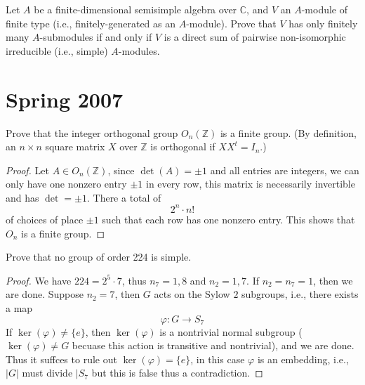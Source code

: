 \documentclass[openany]{book}
\newcommand{\Z}{\mathbb{Z}}
\begin{document}
\begin{prob}
    Let \(A\) be a finite-dimensional semisimple algebra over \(\mathbb{C}\), and \(V\) an \(A\)-module of finite type (i.e., finitely-generated as an \(A\)-module). Prove that \(V\) has only finitely many \(A\)-submodules if and only if \(V\) is a direct sum of pairwise non-isomorphic irreducible (i.e., simple) \(A\)-modules.
\end{prob}







\chapter{Spring 2007}



\begin{prob}
    Prove that the integer orthogonal group \(O_n(\mathbb{Z})\) is a finite group. (By definition, an \(n \times n\) square matrix \(X\) over \(\mathbb{Z}\) is orthogonal if \(XX^t = I_n\).)
\end{prob}
\begin{proof}
    Let $A\in O_n(\Z)$, since $\det(A)=\pm 1$ and all entries are integers, we can only have one nonzero entry $\pm 1$ in every row, this matrix is necessarily invertible and has $\det=\pm 1$. There a total of 
    \begin{equation*}
        2^n\cdot n!
    \end{equation*}
    of choices of place $\pm1$ such that each row has one nonzero entry. This shows that $O_n$ is a finite group.
\end{proof}

\begin{prob}
    Prove that no group of order 224 is simple.
\end{prob}
\begin{proof}
    We have $224=2^5\cdot 7$, thus $n_7=1,8$ and $n_2=1,7$. If $n_2=n_7=1$, then we are done. Suppose $n_2=7$, then $G$ acts on the Sylow $2$ subgroups, i.e., there exists a map 
    \begin{equation*}
        \varphi: G\to S_7
    \end{equation*}
    If $\ker(\varphi)\neq \{e\}$, then $\ker(\varphi)$ is a nontrivial normal subgroup ($\ker(\varphi)\neq G$ becuase this action is transitive and nontrivial), and we are done.  Thus it suffces to rule out $\ker(\varphi)=\{e\}$, in this case $\varphi$ is an embedding, i.e., $|G|$ must divide $|S_7$ but this is false thus a contradiction. 
\end{proof}
\end{document}
